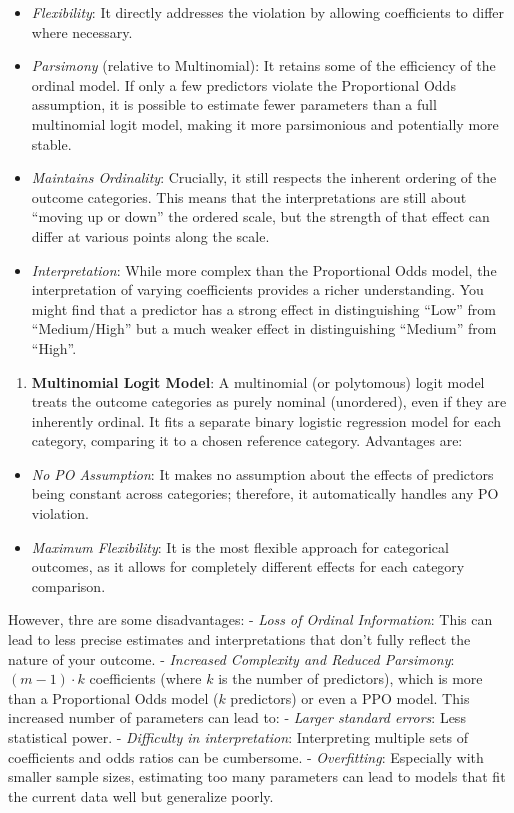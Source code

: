 \documentclass[
  letterpaper,
  DIV=11,
  numbers=noendperiod]{scrartcl}
\providecommand{\tightlist}{%
  \setlength{\itemsep}{0pt}\setlength{\parskip}{0pt}}\usepackage{longtable,booktabs,array}
\begin{document}
\begin{itemize}
\tightlist
\item
  \emph{Flexibility}: It directly addresses the violation by allowing
  coefficients to differ where necessary.
\item
  \emph{Parsimony} (relative to Multinomial): It retains some of the
  efficiency of the ordinal model. If only a few predictors violate the
  Proportional Odds assumption, it is possible to estimate fewer
  parameters than a full multinomial logit model, making it more
  parsimonious and potentially more stable.
\item
  \emph{Maintains Ordinality}: Crucially, it still respects the inherent
  ordering of the outcome categories. This means that the
  interpretations are still about ``moving up or down'' the ordered
  scale, but the strength of that effect can differ at various points
  along the scale.
\item
  \emph{Interpretation}: While more complex than the Proportional Odds
  model, the interpretation of varying coefficients provides a richer
  understanding. You might find that a predictor has a strong effect in
  distinguishing ``Low'' from ``Medium/High'' but a much weaker effect
  in distinguishing ``Medium'' from ``High''.
\end{itemize}

\begin{enumerate}
\def\labelenumi{\arabic{enumi}.}
\setcounter{enumi}{1}
\tightlist
\item
  \textbf{Multinomial Logit Model}: A multinomial (or polytomous) logit
  model treats the outcome categories as purely nominal (unordered),
  even if they are inherently ordinal. It fits a separate binary
  logistic regression model for each category, comparing it to a chosen
  reference category. Advantages are:
\end{enumerate}

\begin{itemize}
\tightlist
\item
  \emph{No PO Assumption}: It makes no assumption about the effects of
  predictors being constant across categories; therefore, it
  automatically handles any PO violation.
\item
  \emph{Maximum Flexibility}: It is the most flexible approach for
  categorical outcomes, as it allows for completely different effects
  for each category comparison.
\end{itemize}

However, thre are some disadvantages: - \emph{Loss of Ordinal
Information}: This can lead to less precise estimates and
interpretations that don't fully reflect the nature of your outcome. -
\emph{Increased Complexity and Reduced Parsimony}: \((m−1)\cdot k\)
coefficients (where \(k\) is the number of predictors), which is more
than a Proportional Odds model (\(k\) predictors) or even a PPO model.
This increased number of parameters can lead to: - \emph{Larger standard
errors}: Less statistical power. - \emph{Difficulty in interpretation}:
Interpreting multiple sets of coefficients and odds ratios can be
cumbersome. - \emph{Overfitting}: Especially with smaller sample sizes,
estimating too many parameters can lead to models that fit the current
data well but generalize poorly.
\end{document}
